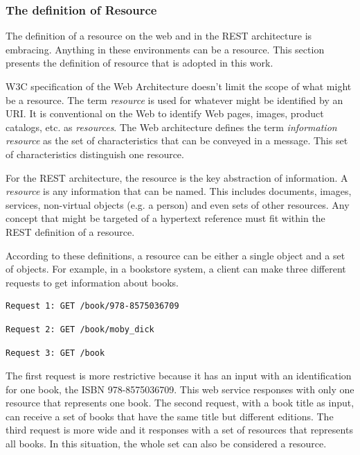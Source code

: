 \documentclass{singlecol-new}
\theoremstyle{TH}{
\newtheorem{lemma}{Lemma}
\newtheorem{theorem}[lemma]{Theorem}
\newtheorem{corrolary}[lemma]{Corrolary}
\newtheorem{conjecture}[lemma]{Conjecture}
\newtheorem{proposition}[lemma]{Proposition}
\newtheorem{claim}[lemma]{Claim}
\newtheorem{stheorem}[lemma]{Wrong Theorem}
\newtheorem{algorithm}{Algorithm}
}
\theoremstyle{THrm}{
\newtheorem{definition}{Definition}[section]
\newtheorem{question}{Question}[section]
\newtheorem{remark}{Remark}
\newtheorem{scheme}{Scheme}
}
\theoremstyle{THhit}{
\newtheorem{case}{Case}[section]
}
\begin{document}

\subsubsection{The definition of Resource}
\label{sec:resourcedefinition}
The definition of a resource on the web and in the REST architecture is embracing. Anything in these environments can be a resource. This section presents the definition of resource that is adopted in this work.

W3C specification of the Web Architecture doesn't limit the scope of what might be a resource. 
The term \textit{resource} is used for whatever might be identified by an URI.
It is conventional on the Web to identify Web pages, images, product catalogs, etc. as \textit{resources}.
The Web architecture \citep{webarch} defines the term \textit{information resource} as the set of characteristics that can be conveyed in a message. 
This set of characteristics distinguish one resource.

For the REST architecture, the resource is the key abstraction of information. 
A \textit{resource} is any information that can be named. 
This includes documents, images, services, non-virtual objects (e.g. a person) and even sets of other resources. 
Any concept that might be targeted of a hypertext reference must fit within the REST definition of a resource.

According to these definitions, a resource can be either a single object and a set of objects. For example, in a bookstore system, a client can make three different requests to get information about books. 

\begin{lstlisting}
Request 1: GET /book/978-8575036709
\end{lstlisting} 

\begin{lstlisting}
Request 2: GET /book/moby_dick
\end{lstlisting} 

\begin{lstlisting}
Request 3: GET /book
\end{lstlisting} 

The first request is more restrictive because it has an input with an identification for one book, the ISBN 978-8575036709. This web service responses with only one resource that represents one book. The second request, with a book title as input, can receive a set of books that have the same title but different editions. The third request is more wide and it responses with a set of resources that represents all books. In this situation, the whole set can also be considered a resource.
\end{document}
